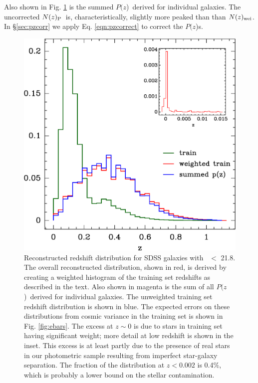 \documentclass[12pt,preprint]{aastex}
\newcommand{\rmax}{21.8}
\newcommand{\pofz}{$P(z$)}
\newcommand{\nwei}{N(z)_{\rm wei}}
\newcommand{\npz}{N(z)_{\rm P}}
\begin{document}
Also shown in Fig. \ref{fig:pofz} is the summed \pofz\ derived for individual
galaxies.  The uncorrected $\npz$\ is, characteristically, slightly more peaked than
than $\nwei$.
In \S \ref{sec:pzcorr} we apply Eq. \ref{eqn:pzcorrect} to correct the \pofz s.

\begin{figure}[p] \centering
    \includegraphics[scale=0.9]{figures/zweight-10-zhist-withorig-withsum-12.eps}

    \caption{Reconstructed redshift distribution for SDSS galaxies with \rmag\
    $ < $ \rmax.  The overall reconstructed distribution, shown in red, is
    derived by creating a weighted histogram of the training set redshifts as
    described in the text.  Also shown in magenta is the sum of all \pofz\
    derived for individual galaxies.  The unweighted training set redshift
    distribution is shown in blue.  The expected errors on these distributions
    from cosmic variance in the training set is shown in Fig.  \ref{fig:ebars}.
    The excess at $z \sim 0$ is due to stars in training set having significant
    weight; more detail at low redshift is shown in the inset.  This excess is
    at least partly due to the presence of real stars in our photometric sample
    resulting from imperfect star-galaxy separation.  The fraction of the
    distribution at $z < 0.002$ is 0.4\%, which is probably a lower bound on
    the stellar contamination.  \label{fig:pofz}}

    \vspace{2em}
\end{figure}
\end{document}

